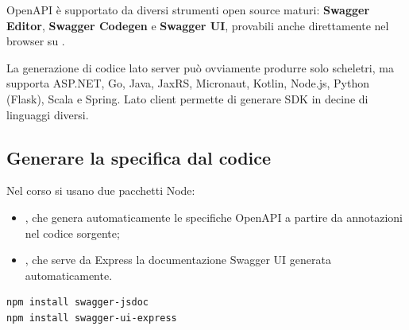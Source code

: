OpenAPI è supportato da diversi strumenti open source maturi: \textbf{Swagger
Editor}, \textbf{Swagger Codegen} e \textbf{Swagger UI}, provabili anche
direttamente nel browser su .

La generazione di codice lato server può ovviamente produrre solo scheletri, ma
supporta ASP.NET, Go, Java, JaxRS, Micronaut, Kotlin, Node.js, Python (Flask),
Scala e Spring. Lato client permette di generare SDK in decine di linguaggi
diversi.


\subsection{Generare la specifica dal codice}

Nel corso si usano due pacchetti Node:

\begin{itemize}
  \item {}, che genera automaticamente le specifiche OpenAPI a
        partire da annotazioni nel codice sorgente;
  \item {}, che serve da Express la documentazione
        Swagger UI generata automaticamente.
\end{itemize}

\begin{lstlisting}[style=shell]
npm install swagger-jsdoc
npm install swagger-ui-express
\end{lstlisting}

